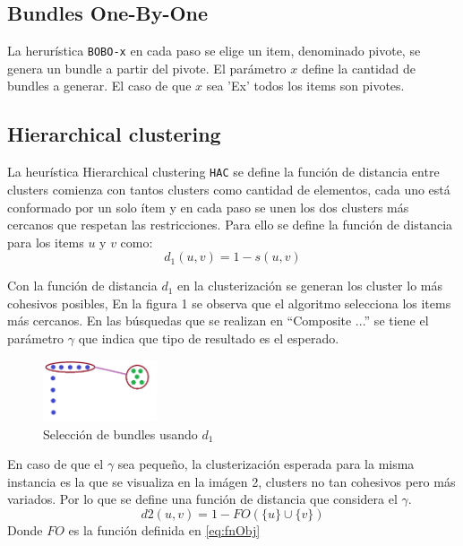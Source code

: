 \subsection{Bundles One-By-One}
La herurística \texttt{BOBO-x} en cada paso se elige un item, denominado pivote, se genera un bundle a partir del pivote. 
El parámetro $x$ define la cantidad de bundles a generar. El caso de que $x$ sea 'Ex' todos los 
items son pivotes.\\
\subsection{Hierarchical clustering}
La heurística Hierarchical clustering \texttt{HAC} 
se define la función de distancia entre clusters comienza con tantos clusters como cantidad de elementos, cada uno está 
conformado por un solo ítem y en cada paso se unen los dos clusters más cercanos que respetan las restricciones. 
Para ello se define la función de distancia para los items $u$ y $v$ como:\\
\begin{equation}
d_{1}(u,v) = 1 - s(u, v)
\end{equation}

Con la función de distancia $d_{1}$ en la clusterización se generan los cluster lo más cohesivos posibles,
En la figura 1 se observa que el algoritmo selecciona los items más cercanos. En las búsquedas que 
se realizan en ``Composite ...''\cite{compositeRetrival} se tiene el parámetro $\gamma$ que indica 
que tipo de resultado es el esperado. 

\begin{figure}[H]
  \centering
    \includegraphics[width=0.3\textwidth]{img/cluster2.png}
  \caption{Selección de bundles usando $d_{1}$}
  \label{res:img-usingEfficientHAC}
\end{figure}

En caso de que el $\gamma$ sea pequeño, la 
clusterización esperada para la misma instancia es la que se visualiza en la imágen 2, clusters no 
tan cohesivos pero más variados. Por lo que se define una función de distancia que considera el 
$\gamma$.\\
\begin{equation}
d2(u,v) = 1 - FO(\{u\} \cup \{v\})
\end{equation}
Donde $FO$ es la función definida en \eqref{eq:fnObj} \\

